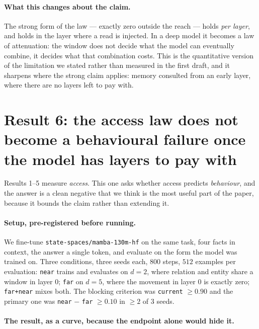 \documentclass[10pt]{article}
\begin{document}
\paragraph{What this changes about the claim.} The strong form of the law --- exactly zero outside
the reach --- holds \emph{per layer}, and holds in the layer where a read is injected. In a deep model
it becomes a law of attenuation: the window does not decide what the model can eventually combine, it
decides what that combination costs. This is the quantitative version of the limitation we stated
rather than measured in the first draft, and it sharpens where the strong claim applies: memory
consulted from an early layer, where there are no layers left to pay with.

\section{Result 6: the access law does not become a behavioural failure once the model has layers to pay with}

Results 1--5 measure \emph{access}. This one asks whether access predicts \emph{behaviour}, and the
answer is a clean negative that we think is the most useful part of the paper, because it bounds the
claim rather than extending it.

\paragraph{Setup, pre-registered before running.} We fine-tune \texttt{state-spaces/mamba-130m-hf} on
the same task, four facts in context, the answer a single token, and evaluate on the form the model
was trained on. Three conditions, three seeds each, $800$ steps, $512$ examples per evaluation:
\texttt{near} trains and evaluates on $d{=}2$, where relation and entity share a window in layer $0$;
\texttt{far} on $d{=}5$, where the movement in layer $0$ is exactly zero; \texttt{far+near} mixes
both. The blocking criterion was \texttt{current} $\ge 0.90$ and the primary one was
\texttt{near} $-$ \texttt{far} $\ge 0.10$ in $\ge 2$ of $3$ seeds.

\paragraph{The result, as a curve, because the endpoint alone would hide it.}
\end{document}
